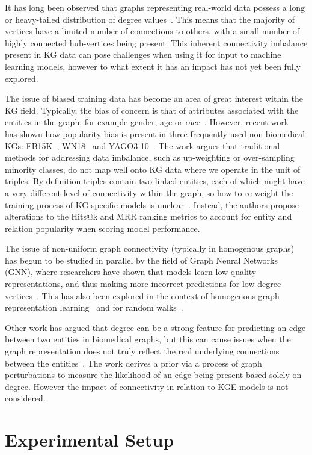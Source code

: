 It has long been observed that graphs representing real-world data possess a long or heavy-tailed distribution of degree values~\cite{barabasi1999emergence}. This means that the majority of vertices have a limited number of connections to others, with a small number of highly connected hub-vertices being present. This inherent connectivity imbalance present in KG data can pose challenges when using it for input to machine learning models, however to what extent it has an impact has not yet been fully explored.

The issue of biased training data has become an area of great interest within the KG field. Typically, the bias of concern is that of attributes associated with the entities in the graph, for example gender, age or race~\cite{wang2021unbiased, arduini2020adversarial, bourli2020bias}. However, recent work~\cite{mohamed2020popularity} has shown how popularity bias is present in three frequently used non-biomedical KGs: FB15K~\cite{bordes2013translating}, WN18~\cite{bordes2013translating} and YAGO3-10~\cite{mahdisoltani2014yago3}. The work argues that traditional methods for addressing data imbalance, such as up-weighting or over-sampling minority classes, do not map well onto KG data where we operate in the unit of triples. By definition triples contain two linked entities, each of which might have a very different level of connectivity within the graph, so how to re-weight the training process of KG-specific models is unclear~\cite{mohamed2020popularity}. Instead, the authors propose alterations to the Hits@k and MRR ranking metrics to account for entity and relation popularity when scoring model performance.

The issue of non-uniform graph connectivity (typically in homogenous graphs) has begun to be studied in parallel by the field of Graph Neural Networks (GNN), where researchers have shown that models learn low-quality representations, and thus making more incorrect predictions for low-degree vertices~\cite{liu2020towards, liu2021tail, tang2020investigating}. This has also been explored in the context of homogenous graph representation learning~\cite{arduini2020adversarial} and for random walks~\cite{kojaku2021residual2vec, rahman2019fairwalk}.

Other work has argued that degree can be a strong feature for predicting an edge between two entities in biomedical graphs, but this can cause issues when the graph representation does not truly reflect the real underlying connections between the entities~\cite{zietz2020probability}. The work derives a prior via a process of graph perturbations to measure the likelihood of an edge being present based solely on degree. However the impact of connectivity in relation to KGE models is not considered.\section{Experimental Setup}\label{sec:expsetup}

